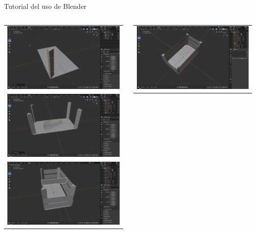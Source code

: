 \begin{frame}{Tutorial del uso de Blender \footnotemark}
\begin{columns}
\begin{column}{0.23\textwidth}
    \begin{center}
	    \begin{tabular}{c}
		        \includegraphics[width=0.75\linewidth]{Figs/VideoBlender04}\\
		        \includegraphics[width=0.75\linewidth]{Figs/VideoBlender05}\\
		        \includegraphics[width=0.75\linewidth]{Figs/VideoBlender06}\\
	    \end{tabular}
    \end{center}	
\end{column}
\begin{column}{0.23\textwidth}
    \begin{center}
	    \begin{tabular}{c}
		        \includegraphics[width=0.75\linewidth]{Figs/VideoBlender07}\\

\end{tabular}
\end{center}
\end{column}
\end{columns}
\end{frame}
